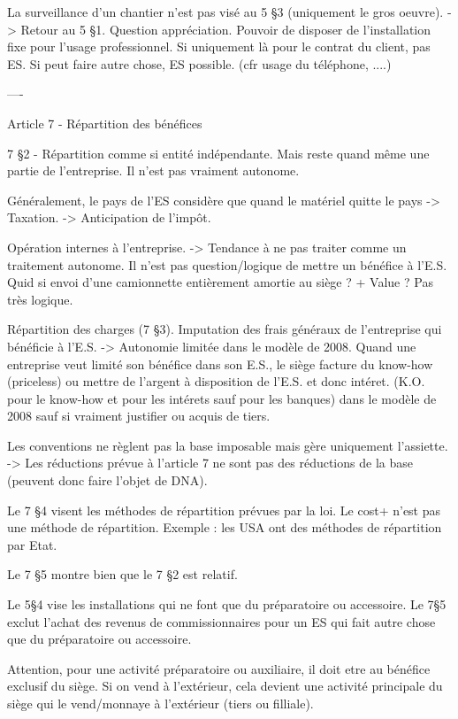 \documentclass{book}
\begin{document}
La surveillance d'un chantier n'est pas visé au 5 §3 (uniquement le gros oeuvre). -> Retour au 5 §1. Question appréciation. Pouvoir de disposer de l'installation fixe pour l'usage professionnel. Si uniquement là pour le contrat du client, pas ES. Si peut faire autre chose, ES possible. (cfr usage du téléphone, ....)


----

Article 7 - Répartition des bénéfices

7 §2 - Répartition comme si entité indépendante. Mais reste quand même une partie de l'entreprise. Il n'est pas vraiment autonome.

Généralement, le pays de l'ES considère que quand le matériel quitte le pays -> Taxation. -> Anticipation de l'impôt.

Opération internes à l'entreprise. -> Tendance à ne pas traiter comme un traitement autonome. Il n'est pas question/logique de mettre un bénéfice à l'E.S. Quid si envoi d'une camionnette entièrement amortie au siège ? + Value ? Pas très logique.

Répartition des charges (7 §3). Imputation des frais généraux de l'entreprise qui bénéficie à l'E.S. -> Autonomie limitée dans le modèle de 2008. Quand une entreprise veut limité son bénéfice dans son E.S., le siège facture du know-how (priceless) ou mettre de l'argent à disposition de l'E.S. et donc intéret. (K.O. pour le know-how et pour les intérets sauf pour les banques) dans le modèle de 2008 sauf si vraiment justifier ou acquis de tiers.

Les conventions ne règlent pas la base imposable mais gère uniquement l'assiette. -> Les réductions prévue à l'article 7 ne sont pas des réductions de la base (peuvent donc faire l'objet de DNA).

Le 7 §4 visent les méthodes de répartition prévues par la loi. Le cost+ n'est pas une méthode de répartition. Exemple : les USA ont des méthodes de répartition par Etat.

Le 7 §5 montre bien que le 7 §2 est relatif.

Le 5§4 vise les installations qui ne font que du préparatoire ou accessoire. Le 7§5 exclut l'achat des revenus de commissionnaires pour un ES qui fait autre chose que du préparatoire ou accessoire.

Attention, pour une activité préparatoire ou auxiliaire, il doit etre au bénéfice exclusif du siège. Si on vend à l'extérieur, cela devient une activité principale du siège qui le vend/monnaye à l'extérieur (tiers ou filliale).
\end{document}
